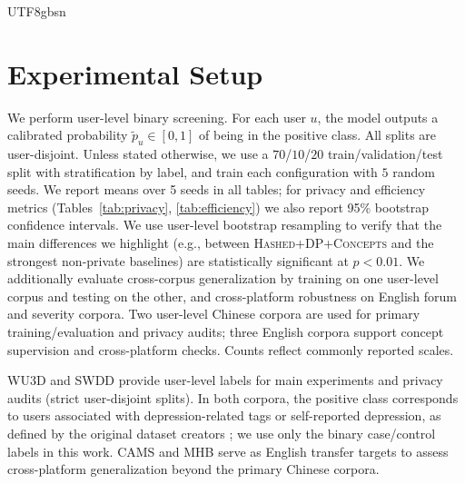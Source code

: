 \documentclass[lettersize,journal]{IEEEtran}
\renewcommand{\arraystretch}{0.99}
\begin{document}
\begin{CJK*}{UTF8}{gbsn}
\section{Experimental Setup}
\label{sec:exp}

We perform user-level binary screening. For each user $u$, the model outputs a calibrated probability $\tilde{p}_u \in [0,1]$ of being in the positive class. All splits are user-disjoint. Unless stated otherwise, we use a $70$/$10$/$20$ train/validation/test split with stratification by label, and train each configuration with $5$ random seeds. We report means over 5 seeds in all tables; for privacy and efficiency metrics (Tables~\ref{tab:privacy}, \ref{tab:efficiency}) we also report 95\% bootstrap confidence intervals. We use user-level bootstrap resampling to verify that the main differences we highlight (e.g., between \textsc{Hashed+DP+Concepts} and the strongest non-private baselines) are statistically significant at $p{<}0.01$. We additionally evaluate cross-corpus generalization by training on one user-level corpus and testing on the other, and cross-platform robustness on English forum and severity corpora. Two user-level Chinese corpora are used for primary training/evaluation and privacy audits; three English corpora support concept supervision and cross-platform checks. Counts reflect commonly reported scales.

\begin{table}[t]
\centering
\caption{Corpora summary. Primary corpora (WU3D, SWDD) for main evaluation; others for cross-platform transfer.}
\label{tab:data}
\renewcommand{\arraystretch}{1.05}
\vspace{0.2em}
\begin{flushleft}
\footnotesize WU3D and SWDD provide user-level labels for main experiments and privacy audits (strict user-disjoint splits). In both corpora, the positive class corresponds to users associated with depression-related tags or self-reported depression, as defined by the original dataset creators \cite{Wang2022INS_WU3D,Lan2025EMNLP}; we use only the binary case/control labels in this work. CAMS and MHB serve as English transfer targets to assess cross-platform generalization beyond the primary Chinese corpora.
\end{flushleft}
\end{table}



\end{CJK*}
\end{document}
